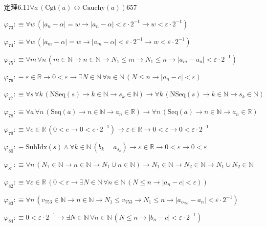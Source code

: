 \begin{fullproof}{定理6.11}{$\forall a\,(\mathrm{Cgt}(a) \leftrightarrow \mathrm{Cauchy}(a))$}{657}
\begin{abbrevlist}
\item $\varphi_{73} :\equiv \forall w\,(\lvert a_{n} - \alpha \rvert = w \to \lvert a_{n} - \alpha \rvert < \varepsilon \cdot 2^{-1} \to w < \varepsilon \cdot 2^{-1})$
\item $\varphi_{74} :\equiv \forall w\,(\lvert a_{m} - \alpha \rvert = w \to \lvert a_{m} - \alpha \rvert < \varepsilon \cdot 2^{-1} \to w < \varepsilon \cdot 2^{-1})$
\item $\varphi_{75} :\equiv \forall m\,\forall n\,(m \in \mathbb{N} \to n \in \mathbb{N} \to N_{1} \leq m \to N_{1} \leq n \to \lvert a_{m} - a_{n} \rvert < \varepsilon \cdot 2^{-1})$
\item $\varphi_{76} :\equiv \varepsilon \in \mathbb{R} \to 0 < \varepsilon \to \exists N \in \mathbb{N}\,\forall n \in \mathbb{N}\,(N \leq n \to \lvert a_{n} - c \rvert < \varepsilon)$
\item $\varphi_{77} :\equiv \forall s\,\forall k\,(\mathrm{NSeq}(s) \to k \in \mathbb{N} \to s_{k} \in \mathbb{N}) \to \forall k\,(\mathrm{NSeq}(s) \to k \in \mathbb{N} \to s_{k} \in \mathbb{N})$
\item $\varphi_{78} :\equiv \forall a\,\forall n\,(\mathrm{Seq}(a) \to n \in \mathbb{N} \to a_{n} \in \mathbb{R}) \to \forall n\,(\mathrm{Seq}(a) \to n \in \mathbb{N} \to a_{n} \in \mathbb{R})$
\item $\varphi_{79} :\equiv \forall e \in \mathbb{R}\,(0 < e \to 0 < e \cdot 2^{-1}) \to \varepsilon \in \mathbb{R} \to 0 < \varepsilon \to 0 < \varepsilon \cdot 2^{-1}$
\item $\varphi_{80} :\equiv \mathrm{SubIdx}(s) \land \forall k \in \mathbb{N}\,(b_{k} = a_{s_{k}}) \to \varepsilon \in \mathbb{R} \to 0 < \varepsilon \to 0 < \varepsilon$
\item $\varphi_{81} :\equiv \forall n\,(N_{1} \in \mathbb{N} \to n \in \mathbb{N} \to N_{1} \cup n \in \mathbb{N}) \to N_{1} \in \mathbb{N} \to N_{2} \in \mathbb{N} \to N_{1} \cup N_{2} \in \mathbb{N}$
\item $\varphi_{82} :\equiv \forall \varepsilon \in \mathbb{R}\,(0 < \varepsilon \to \exists N \in \mathbb{N}\,\forall n \in \mathbb{N}\,(N \leq n \to \lvert a_{n} - c \rvert < \varepsilon))$
\item $\varphi_{83} :\equiv \forall n\,(v_{753} \in \mathbb{N} \to n \in \mathbb{N} \to N_{1} \leq v_{753} \to N_{1} \leq n \to \lvert a_{v_{753}} - a_{n} \rvert < \varepsilon \cdot 2^{-1})$
\item $\varphi_{84} :\equiv 0 < \varepsilon \cdot 2^{-1} \to \exists N \in \mathbb{N}\,\forall n \in \mathbb{N}\,(N \leq n \to \lvert b_{n} - c \rvert < \varepsilon \cdot 2^{-1})$

\end{abbrevlist}
\end{fullproof}

